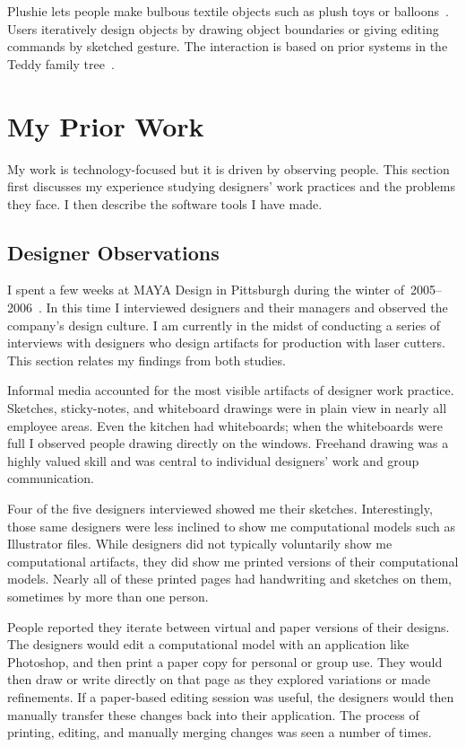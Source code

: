 \documentclass[12pt]{article}
\begin{document}
Plushie lets people make bulbous textile objects such as plush toys or
balloons~\cite{mori-plushie}. Users iteratively design objects by
drawing object boundaries or giving editing commands by sketched
gesture. The interaction is based on prior systems in the Teddy family
tree~\cite{igarashi-teddy}.

\section{My Prior Work}

My work is technology-focused but it is driven by observing
people. This section first discusses my experience studying designers'
work practices and the problems they face. I then describe the
software tools I have made.

\subsection{Designer Observations}

I spent a few weeks at MAYA Design in Pittsburgh during the winter
of~2005--2006~\cite{johnson-tiny-ethnography}. In this time I
interviewed designers and their managers and observed the company's
design culture. I am currently in the midst of conducting a series of
interviews with designers who design artifacts for production with
laser cutters. This section relates my findings from both studies.

Informal media accounted for the most visible artifacts of designer
work practice. Sketches, sticky-notes, and whiteboard drawings were in
plain view in nearly all employee areas. Even the kitchen had
whiteboards; when the whiteboards were full I observed people drawing
directly on the windows. Freehand drawing was a highly valued skill
and was central to individual designers' work and group communication.

Four of the five designers interviewed showed me their
sketches. Interestingly, those same designers were less inclined to
show me computational models such as Illustrator files. While
designers did not typically voluntarily show me computational
artifacts, they did show me printed versions of their computational
models. Nearly all of these printed pages had handwriting and sketches
on them, sometimes by more than one person. 

People reported they iterate between virtual and paper versions of
their designs. The designers would edit a computational model with an
application like Photoshop, and then print a paper copy for personal
or group use. They would then draw or write directly on that page as
they explored variations or made refinements. If a paper-based editing
session was useful, the designers would then manually transfer these
changes back into their application. The process of printing, editing,
and manually merging changes was seen a number of times.
\end{document}
